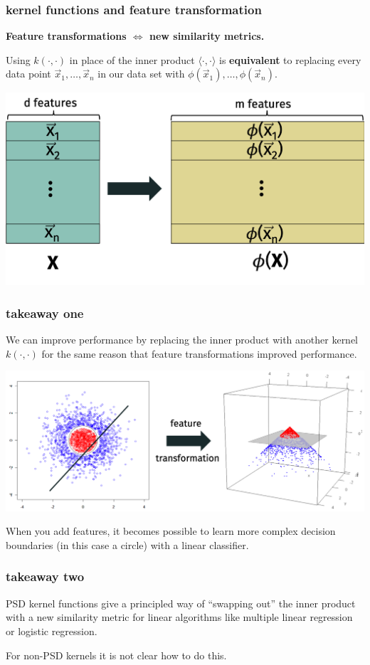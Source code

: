 \documentclass[handout,compress]{beamer}
\begin{document}
\begin{frame} 
	\frametitle{kernel functions and feature transformation}
	\begin{center}
		\textbf{Feature transformations $\Longleftrightarrow$ new similarity metrics.}
	\end{center}
	Using $k(\cdot,\cdot)$ in place of the inner product $\langle\cdot,\cdot\rangle$ is \textbf{\alert{equivalent}} to replacing every data point $\vec{x}_1,\ldots, \vec{x}_n$ in our data set with $\phi(\vec{x}_1), \ldots, \phi(\vec{x}_n)$. 
	\begin{center}
		\includegraphics[width=.7\textwidth]{feature_transformation.png}
	\end{center}
\end{frame}

\begin{frame} 
	\frametitle{takeaway one}
	We can improve performance by replacing the inner product with another kernel $k(\cdot,\cdot)$ for the same reason that feature transformations improved performance.
	\begin{center}
		\includegraphics[width=.8\textwidth]{kernel_vis.png}
	\end{center}
	When you add features, it becomes possible to learn more complex decision boundaries (in this case a circle) with a linear classifier.
\end{frame}

\begin{frame} 
	\frametitle{takeaway two}
	PSD kernel functions give a principled way of ``swapping out'' the inner product with a new similarity metric for linear algorithms like multiple linear regression or logistic regression.
	
For non-PSD kernels it is not clear how to do this.
\end{frame}
\end{document}
